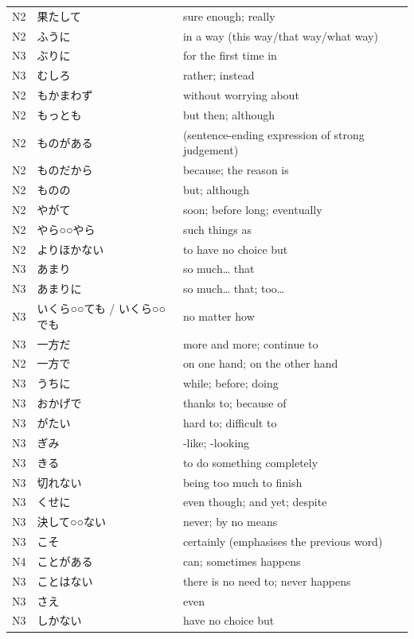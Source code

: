 \begin{longtable}{p{2cm} p{4cm} p{8cm}}
N2	&   果たして    &  	sure enough; really\\
N2	&   ふうに	&       in a way (this way/that way/what way)\\
N3	&   ぶりに	&       for the first time in\\
N3	&   むしろ	&       rather; instead\\
N2	&   もかまわず   &	without worrying about\\
N2	&   もっとも    &	but then; although\\
N2	&   ものがある &     	(sentence-ending expression of strong judgement)\\
N2	&   ものだから   &	because; the reason is\\
N2	&   ものの      &   	but; although\\
N2	&   やがて &       	soon; before long; eventually\\
N2	&   やら○○やら  &	such things as\\
N2	&   よりほかない  &	to have no choice but\\
N3	&   あまり     &   	so much… that \\
N3	&   あまりに    &	so much… that; too…\\
N3	&   いくら○○ても / いくら○○でも   &	no matter how\\
N3	&   一方だ	    &   more and more; continue to \\
N2	&   一方で	&   on one hand; on the other hand \\
N3	&   うちに &   	while; before; doing \\
N3	&   おかげで &	thanks to; because of \\
N3	&   がたい &   	hard to; difficult to\\
N3	&   ぎみ  &   	-like; -looking\\
N3	&   きる  &	    to do something completely\\
N3	&   切れない	 &  being too much to finish\\
N3	&   くせに &   	even though; and yet; despite\\
N3	&   決して○○ない &	never; by no means \\
N3	&   こそ	    &   certainly (emphasises the previous word)\\
N4	&   ことがある   &	can; sometimes happens\\
N3	&   ことはない   &	there is no need to; never happens\\
N3	&   さえ	    &   even  \\
N3	&   しかない    &	have no choice but\\

\end{longtable}
